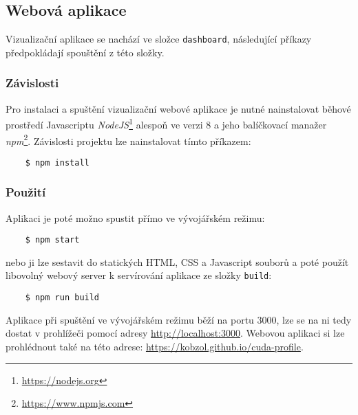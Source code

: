 \subsection{Webová aplikace}
Vizualizační aplikace se nachází ve složce \texttt{dashboard}, následující příkazy předpokládají spouštění z této složky.

\subsubsection{Závislosti}
Pro instalaci a spuštění vizualizační webové aplikace je nutné nainstalovat běhové prostředí Javascriptu \emph{NodeJS}\footnote{\url{https://nodejs.org}} alespoň ve verzi 8 a jeho balíčkovací manažer \emph{npm}\footnote{\url{https://www.npmjs.com}}. Závislosti projektu lze nainstalovat tímto příkazem:
\begin{verbatim}
    $ npm install
\end{verbatim}

\subsubsection{Použití}
Aplikaci je poté možno spustit přímo ve vývojářském režimu:
\begin{verbatim}
    $ npm start
\end{verbatim}
nebo ji lze sestavit do statických HTML, CSS a Javascript souborů a poté použít libovolný webový server k servírování aplikace ze složky \texttt{build}:
\begin{verbatim}
    $ npm run build
\end{verbatim}

Aplikace při spuštění ve vývojářském režimu běží na portu 3000, lze se na ni tedy dostat v prohlížeči pomocí adresy \url{http://localhost:3000}.
Webovou aplikaci si lze prohlédnout také na této adrese: \url{https://kobzol.github.io/cuda-profile}.
